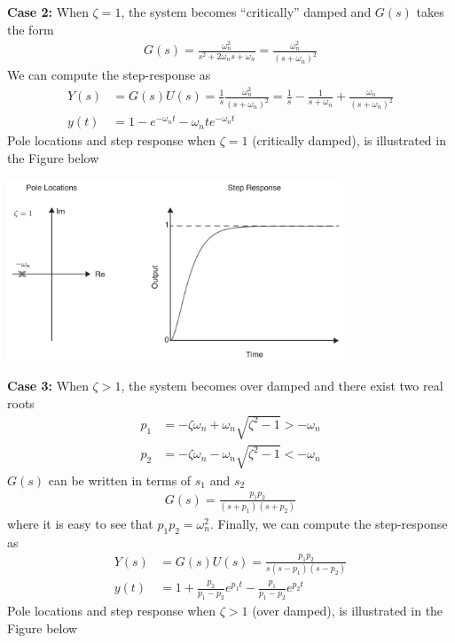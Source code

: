 \documentclass[twoside]{article}
\begin{document}
\textbf{Case 2:} When $\zeta = 1$, the system becomes ``critically'' damped and
$G(s)$ takes the form
%
\begin{align*}
	G(s) = \frac{\omega_n^2}{s^2 + 2 \omega_n s + \omega_n} = \frac{\omega_n^2}{(s + \omega_n )^2}  
\end{align*}
%
We can compute the step-response as
%
\begin{align*}
 Y(s) &= G(s) U(s) = \frac{1}{s} \frac{\omega_n^2}{(s + \omega_n )^2}  
 = \frac{1}{s} -  \frac{1}{s + \omega_n} + \frac{\omega_n}{(s + \omega_n)^2} 
\\
y(t) &= 1 - e^{-\omega_n t} - \omega_n t e^{-\omega_n t}
\end{align*}
%
Pole locations and step response when $\zeta = 1$ (critically damped), is illustrated in
the Figure below

    \begin{minipage}[h]{1\linewidth}
    \begin{center}
     \includegraphics[width=0.75\textwidth]{critical}
    \end{center}
  \end{minipage}
  
  \textbf{Case 3:} When $\zeta > 1$, the system becomes over damped and there exist 
  two real roots
	\begin{align*}
		p_1 &= - \zeta \omega_n + \omega_n \sqrt{\zeta^2 - 1} > - \omega_n 
		\\
		p_2 &= - \zeta \omega_n - \omega_n \sqrt{\zeta^2 - 1} < - \omega_n 
	\end{align*}
%
$G(s)$ can be written in terms of $s_1$ and $s_2$ 
%
\begin{align*}
	G(s) = \frac{p_1 p_2}{(s+p_1) (s+p_2)}
\end{align*}
%
where it is easy to see that $p_1 p_2 = \omega_n^2$. Finally, we can compute the step-response as
%
\begin{align*}
 Y(s) &= G(s) U(s) = \frac{p_1 p_2}{s (s-p_1) (s-p_2)} 
 \\
 y(t) &= 1 + \frac{p_2}{p_1 - p_2} e^{p_1 t} - \frac{p_1}{p_1 - p_2} e^{p_2 t} 
 \end{align*}
 Pole locations and step response when $\zeta > 1$ (over damped), is illustrated in
the Figure below
\end{document}
